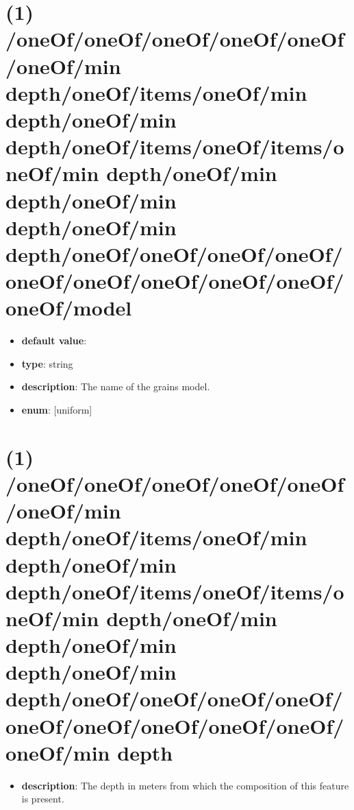 \section{(1) /oneOf/oneOf/oneOf/oneOf/oneOf/oneOf/min depth/oneOf/items/oneOf/min depth/oneOf/min depth/oneOf/items/oneOf/items/oneOf/min depth/oneOf/min depth/oneOf/min depth/oneOf/min depth/oneOf/oneOf/oneOf/oneOf/oneOf/oneOf/oneOf/oneOf/oneOf/oneOf/model}
\begin{itemize}[leftmargin=1em]\item {\bf default value}: 
\item {\bf type}: string
\item {\bf description}: The name of the grains model.
\item {\bf enum}: [uniform]\end{itemize}\section{(1) /oneOf/oneOf/oneOf/oneOf/oneOf/oneOf/min depth/oneOf/items/oneOf/min depth/oneOf/min depth/oneOf/items/oneOf/items/oneOf/min depth/oneOf/min depth/oneOf/min depth/oneOf/min depth/oneOf/oneOf/oneOf/oneOf/oneOf/oneOf/oneOf/oneOf/oneOf/oneOf/min depth}
\begin{itemize}[leftmargin=1em]\item {\bf description}: The depth in meters from which the composition of this feature is present.
\end{itemize}
